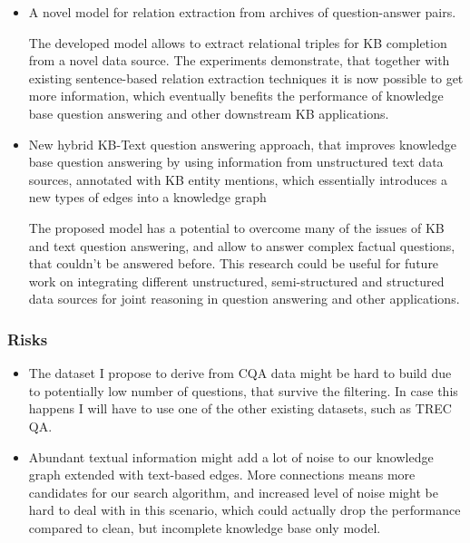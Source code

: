\begin{itemize}
\item A novel model for relation extraction from archives of question-answer pairs.

The developed model allows to extract relational triples for KB completion from a novel data source.
The experiments demonstrate, that together with existing sentence-based relation extraction techniques it is now possible to get more information, which eventually benefits the performance of knowledge base question answering and other downstream KB applications.

\item New hybrid KB-Text question answering approach, that improves knowledge base question answering by using information from unstructured text data sources, annotated with KB entity mentions, which essentially introduces a new types of edges into a knowledge graph

The proposed model has a potential to overcome many of the issues of KB and text question answering, and allow to answer complex factual questions, that couldn't be answered before.
This research could be useful for future work on integrating different unstructured, semi-structured and structured data sources for joint reasoning in question answering and other applications.

\end{itemize}

\subsubsection{Risks}
\label{section:proposal:plan:factoid:risks}

\begin{itemize}
\item The dataset I propose to derive from CQA data might be hard to build due to potentially low number of questions, that survive the filtering. In case this happens I will have to use one of the other existing datasets, such as TREC QA.
\item Abundant textual information might add a lot of noise to our knowledge graph extended with text-based edges. More connections means more candidates for our search algorithm, and increased level of noise might be hard to deal with in this scenario, which could actually drop the performance compared to clean, but incomplete knowledge base only model.
\end{itemize}


